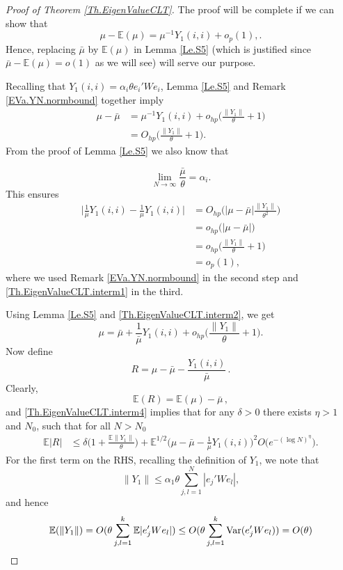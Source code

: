 \documentclass[11pt, reqno]{amsart}
\numberwithin{equation}{section}
\DeclareMathOperator{\Var}{Var}
\newcommand{\E}{\mbox{${\mathbb E}$}}
\def\Var{{\rm Var}}
\begin{document}
\begin{proof}[Proof of Theorem \ref{Th.EigenValueCLT}]
The proof will be complete if we can show that
\begin{equation}
\label{Th.EigenValueCLT.goal}
\mu - \E(\mu) = \mu^{-1}Y_1(i,i) + o_p(1),.
\end{equation}
Hence, replacing $\bar{\mu}$ by $\E(\mu)$ in Lemma \ref{Le.S5} (which is justified since $\bar{\mu}-\E(\mu)=o(1)$ as we will see) will serve our purpose.

Recalling that $Y_1(i,i) = \alpha_i\theta e_i'W e_i$, Lemma \ref{Le.S5} and Remark \ref{EVa.YN.normbound} together imply
\begin{align}
\nonumber
\mu - \bar{\mu} &= \mu^{-1}Y_1(i,i) + o_{hp}\Big(\frac{\|Y_1\|}{\theta} + 1\Big) \\
\label{Th.EigenValueCLT.interm1}
&= O_{hp}\Big(\frac{\|Y_1\|}{\theta} + 1\Big).
\end{align}
From the proof of Lemma \ref{Le.S5} we also know that

\[
\lim _{N \rightarrow \infty} \frac{\bar{\mu}}{\theta}=\alpha_i.
\]
This ensures
\begin{align}
\Big|\frac{1}{\bar{\mu}}Y_1(i,i) - \frac{1}{\mu}Y_1(i,i)\Big|
&= O_{hp}\Big(|\mu-\bar{\mu}|\frac{\|Y_1\|}{\theta^2}\Big) \nonumber \\
&= o_{hp}\big(|\mu-\bar{\mu}|\big) \nonumber \\
&= o_{hp}\Big(\frac{\|Y_1\|}{\theta} + 1\Big) \label{Th.EigenValueCLT.interm2}\\
&= o_p(1), \label{Th.EigenValueCLT.interm3}
\end{align}
where we used Remark \ref{EVa.YN.normbound} in the second step and \eqref{Th.EigenValueCLT.interm1} in the third.

Using Lemma \ref{Le.S5} and \eqref{Th.EigenValueCLT.interm2}, we get
\begin{equation}\label{Th.EigenValueCLT.interm4}
\mu = \bar{\mu} + \frac{1}{\bar{\mu}}Y_1(i,i) + o_{hp}\Big(\frac{\|Y_1\|}{\theta} + 1\Big).
\end{equation}
Now define
\[
R=\mu-\bar\mu-\frac{Y_1(i,i)}{\bar\mu}\,.
\]
Clearly,
\[
\mathbb E (R)=\mathbb E (\mu)-\bar\mu\,,
\]
and \eqref{Th.EigenValueCLT.interm4} implies that for any $\delta>0$ there exists $\eta>1$ and $N_0$, such that for all $N>N_0$
\begin{align*}
\E|R|
&\le \delta\Big(1 + \frac{\E\|Y_1\|}{\theta}\Big) + \E^{1/2}\Big(\mu-\bar{\mu}-\frac{1}{\bar{\mu}}Y_1(i,i)\Big)^2 O\big(e^{-(\log N)^\eta}\big).
\end{align*}
For the first term on the RHS, recalling the definition of $Y_1$, we note that
\begin{equation}\label{normY1}
\|Y_1\| \le \alpha_1\theta \sum_{j,l=1}^N |e_j'W e_l|,
\end{equation}
and hence
\[
\mathbb E(\|Y_1\|) =  O(\theta\sum_{j,l =1}^k \mathbb E|e_j^\prime W e_l|) \le O(\theta\sum_{j,l =1}^k \Var(e_j^\prime W e_l)) = O(\theta)\\     
\]


\end{proof}
\end{document}
